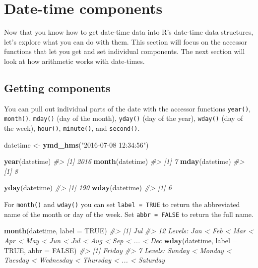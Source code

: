 \documentclass[]{book}
\newenvironment{Shaded}{\begin{snugshade}}{\end{snugshade}}
\newcommand{\KeywordTok}[1]{\textcolor[rgb]{0.13,0.29,0.53}{\textbf{{#1}}}}
\newcommand{\DataTypeTok}[1]{\textcolor[rgb]{0.13,0.29,0.53}{{#1}}}
\newcommand{\StringTok}[1]{\textcolor[rgb]{0.31,0.60,0.02}{{#1}}}
\newcommand{\CommentTok}[1]{\textcolor[rgb]{0.56,0.35,0.01}{\textit{{#1}}}}
\newcommand{\OtherTok}[1]{\textcolor[rgb]{0.56,0.35,0.01}{{#1}}}
\newcommand{\NormalTok}[1]{{#1}}
\begin{document}
\section{Date-time components}\label{date-time-components}

Now that you know how to get date-time data into R's date-time data
structures, let's explore what you can do with them. This section will
focus on the accessor functions that let you get and set individual
components. The next section will look at how arithmetic works with
date-times.

\subsection{Getting components}\label{getting-components}

You can pull out individual parts of the date with the accessor
functions \texttt{year()}, \texttt{month()}, \texttt{mday()} (day of the
month), \texttt{yday()} (day of the year), \texttt{wday()} (day of the
week), \texttt{hour()}, \texttt{minute()}, and \texttt{second()}.

\begin{Shaded}
\begin{Highlighting}[]
\NormalTok{datetime <-}\StringTok{ }\KeywordTok{ymd_hms}\NormalTok{(}\StringTok{"2016-07-08 12:34:56"}\NormalTok{)}

\KeywordTok{year}\NormalTok{(datetime)}
\CommentTok{#> [1] 2016}
\KeywordTok{month}\NormalTok{(datetime)}
\CommentTok{#> [1] 7}
\KeywordTok{mday}\NormalTok{(datetime)}
\CommentTok{#> [1] 8}

\KeywordTok{yday}\NormalTok{(datetime)}
\CommentTok{#> [1] 190}
\KeywordTok{wday}\NormalTok{(datetime)}
\CommentTok{#> [1] 6}
\end{Highlighting}
\end{Shaded}

For \texttt{month()} and \texttt{wday()} you can set
\texttt{label\ =\ TRUE} to return the abbreviated name of the month or
day of the week. Set \texttt{abbr\ =\ FALSE} to return the full name.

\begin{Shaded}
\begin{Highlighting}[]
\KeywordTok{month}\NormalTok{(datetime, }\DataTypeTok{label =} \OtherTok{TRUE}\NormalTok{)}
\CommentTok{#> [1] Jul}
\CommentTok{#> 12 Levels: Jan < Feb < Mar < Apr < May < Jun < Jul < Aug < Sep < ... < Dec}
\KeywordTok{wday}\NormalTok{(datetime, }\DataTypeTok{label =} \OtherTok{TRUE}\NormalTok{, }\DataTypeTok{abbr =} \OtherTok{FALSE}\NormalTok{)}
\CommentTok{#> [1] Friday}
\CommentTok{#> 7 Levels: Sunday < Monday < Tuesday < Wednesday < Thursday < ... < Saturday}
\end{Highlighting}
\end{Shaded}
\end{document}
